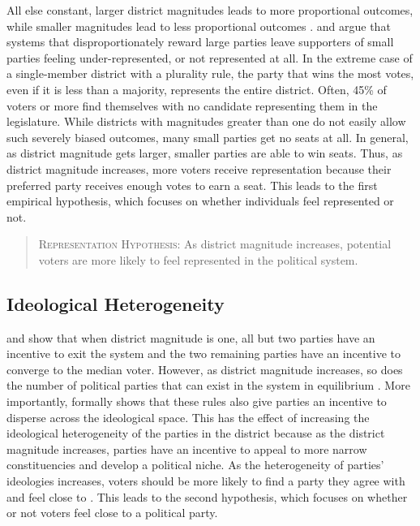 \documentclass[12pt]{article}
\begin{document}
All else constant, larger district magnitudes leads to more proportional outcomes, while smaller magnitudes lead to less proportional outcomes \citep{Cox1997, Benoit2000}. \cite{Banduccietal1999} and \cite{BowlerLanoue1992} argue that systems that disproportionately reward large parties leave supporters of small parties feeling under-represented, or not represented at all. In the extreme case of a single-member district with a plurality rule, the party that wins the most votes, even if it is less than a majority, represents the entire district. Often, 45\% of voters or more find themselves with no candidate representing them in the legislature. While districts with magnitudes greater than one do not easily allow such severely biased outcomes, many small parties get no seats at all. In general, as district magnitude gets larger, smaller parties are able to win seats. Thus, as district magnitude increases, more voters receive representation because their preferred party receives enough votes to earn a seat. This leads to the first empirical hypothesis, which focuses on whether individuals feel represented or not.

\begin{quote}
        \textsc{Representation Hypothesis:} As district magnitude increases, potential voters are more likely to feel represented in the political system.
\end{quote}

\subsection*{Ideological Heterogeneity}

\cite{Downs1957} and \cite{Cox1999b} show that when district magnitude is one, all but two parties have an incentive to exit the system and the two remaining parties have an incentive to converge to the median voter. However, as district magnitude increases, so does the number of political parties that can exist in the system in equilibrium \citep{Cox1997, Cox1999, ClarkGolder2006}. More importantly, \cite{Cox1990} formally shows that these rules also give parties an incentive to disperse across the ideological space. This has the effect of increasing the ideological heterogeneity of the parties in the district because as the district magnitude increases, parties have an incentive to appeal to more narrow constituencies and develop a political niche. As the heterogeneity of parties' ideologies increases, voters should be more likely to find a party they agree with and feel close to \citep{Bowleretal1994}. This leads to the second hypothesis, which focuses on whether or not voters feel close to a political party.
\end{document}
